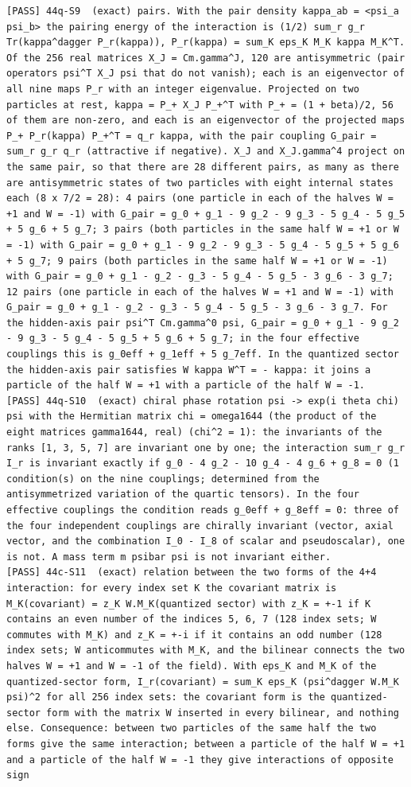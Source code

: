 \documentclass[
  10pt,
]{article}
\begin{document}
\begin{verbatim}
[PASS] 44q-S9  (exact) pairs. With the pair density kappa_ab = <psi_a psi_b> the pairing energy of the interaction is (1/2) sum_r g_r Tr(kappa^dagger P_r(kappa)), P_r(kappa) = sum_K eps_K M_K kappa M_K^T. Of the 256 real matrices X_J = Cm.gamma^J, 120 are antisymmetric (pair operators psi^T X_J psi that do not vanish); each is an eigenvector of all nine maps P_r with an integer eigenvalue. Projected on two particles at rest, kappa = P_+ X_J P_+^T with P_+ = (1 + beta)/2, 56 of them are non-zero, and each is an eigenvector of the projected maps P_+ P_r(kappa) P_+^T = q_r kappa, with the pair coupling G_pair = sum_r g_r q_r (attractive if negative). X_J and X_J.gamma^4 project on the same pair, so that there are 28 different pairs, as many as there are antisymmetric states of two particles with eight internal states each (8 x 7/2 = 28): 4 pairs (one particle in each of the halves W = +1 and W = -1) with G_pair = g_0 + g_1 - 9 g_2 - 9 g_3 - 5 g_4 - 5 g_5 + 5 g_6 + 5 g_7; 3 pairs (both particles in the same half W = +1 or W = -1) with G_pair = g_0 + g_1 - 9 g_2 - 9 g_3 - 5 g_4 - 5 g_5 + 5 g_6 + 5 g_7; 9 pairs (both particles in the same half W = +1 or W = -1) with G_pair = g_0 + g_1 - g_2 - g_3 - 5 g_4 - 5 g_5 - 3 g_6 - 3 g_7; 12 pairs (one particle in each of the halves W = +1 and W = -1) with G_pair = g_0 + g_1 - g_2 - g_3 - 5 g_4 - 5 g_5 - 3 g_6 - 3 g_7. For the hidden-axis pair psi^T Cm.gamma^0 psi, G_pair = g_0 + g_1 - 9 g_2 - 9 g_3 - 5 g_4 - 5 g_5 + 5 g_6 + 5 g_7; in the four effective couplings this is g_0eff + g_1eff + 5 g_7eff. In the quantized sector the hidden-axis pair satisfies W kappa W^T = - kappa: it joins a particle of the half W = +1 with a particle of the half W = -1.
[PASS] 44q-S10  (exact) chiral phase rotation psi -> exp(i theta chi) psi with the Hermitian matrix chi = omega1644 (the product of the eight matrices gamma1644, real) (chi^2 = 1): the invariants of the ranks [1, 3, 5, 7] are invariant one by one; the interaction sum_r g_r I_r is invariant exactly if g_0 - 4 g_2 - 10 g_4 - 4 g_6 + g_8 = 0 (1 condition(s) on the nine couplings; determined from the antisymmetrized variation of the quartic tensors). In the four effective couplings the condition reads g_0eff + g_8eff = 0: three of the four independent couplings are chirally invariant (vector, axial vector, and the combination I_0 - I_8 of scalar and pseudoscalar), one is not. A mass term m psibar psi is not invariant either.
[PASS] 44c-S11  (exact) relation between the two forms of the 4+4 interaction: for every index set K the covariant matrix is M_K(covariant) = z_K W.M_K(quantized sector) with z_K = +-1 if K contains an even number of the indices 5, 6, 7 (128 index sets; W commutes with M_K) and z_K = +-i if it contains an odd number (128 index sets; W anticommutes with M_K, and the bilinear connects the two halves W = +1 and W = -1 of the field). With eps_K and M_K of the quantized-sector form, I_r(covariant) = sum_K eps_K (psi^dagger W.M_K psi)^2 for all 256 index sets: the covariant form is the quantized-sector form with the matrix W inserted in every bilinear, and nothing else. Consequence: between two particles of the same half the two forms give the same interaction; between a particle of the half W = +1 and a particle of the half W = -1 they give interactions of opposite sign

\end{verbatim}
\end{document}
